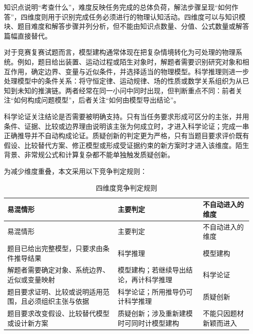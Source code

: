 \documentclass[
  12pt,
  a4paper,twoside,openany]{ctexbook}
\begin{document}
知识点说明``考查什么''，难度反映任务完成的总体负荷，解法步骤呈现``如何作答''，四维度则用于识别完成任务必须进行的物理认知活动。四维度可以与知识模块、题目难度和解答步骤并列分析，但不能由知识点数量、分值、公式数量或解答篇幅直接替代。

对于竞赛复赛试题而言，模型建构通常体现在把复杂情境转化为可处理的物理系统。例如，题目给出装置、运动过程或陌生对象时，解题者需要识别研究对象和相互作用，确定边界、变量与近似条件，并选择适当的物理模型。科学推理则进一步处理模型中的条件关系：将守恒定律、运动规律、场的性质或数学关系组织为从已知到未知的推演链。两者经常在同一小问中同时出现，但判断重点不同：前者关注``如何构成问题模型''，后者关注``如何由模型导出结论''。

科学论证关注结论是否需要被明确支持。只有当任务要求形成可区分的主张，并用条件、证据、比较或边界理由说明该主张为何成立时，才进入科学论证；完成一串正确推导并不自动构成论证。质疑创新的判定更为严格，只有当题目要求评价既有假设、比较替代方案、修正模型或形成受证据约束的新方案时才进入该维度。陌生背景、非常规公式和计算复杂都不能单独触发质疑创新。

为减少维度重叠，本文采用以下竞争判定规则：

\begin{longtable}[]{@{}
  >{\raggedright\arraybackslash}p{}
  >{\raggedright\arraybackslash}p{}
  >{\raggedright\arraybackslash}p{}@{}}
\caption{四维度竞争判定规则}\tabularnewline
\toprule\noalign{}
\rowcolor{ThesisPale}
\begin{minipage}[b]{\linewidth}\raggedright
易混情形
\end{minipage} & \begin{minipage}[b]{\linewidth}\raggedright
主要判定
\end{minipage} & \begin{minipage}[b]{\linewidth}\raggedright
不自动进入的维度
\end{minipage} \\
\midrule\noalign{}
\endfirsthead
\toprule\noalign{}
\rowcolor{ThesisPale}
\begin{minipage}[b]{\linewidth}\raggedright
易混情形
\end{minipage} & \begin{minipage}[b]{\linewidth}\raggedright
主要判定
\end{minipage} & \begin{minipage}[b]{\linewidth}\raggedright
不自动进入的维度
\end{minipage} \\
\midrule\noalign{}
\endhead
\bottomrule\noalign{}
\endlastfoot
题目已给出完整模型，只要求由条件推导结果 & 科学推理 & 模型建构 \\
解题者需要确定对象、系统边界、近似或变量映射 &
模型建构；若继续导出结论，再计科学推理 & 科学论证 \\
题目要求证明、比较或说明适用范围，且必须组织主张与依据 &
科学论证；所用推导仍可计科学推理 & 质疑创新 \\
题目要求改变假设、比较替代模型或设计新方案 &
质疑创新；涉及重新建模时可同时计模型建构 & 不能只因题材新颖而进入 \\
\end{longtable}
\end{document}

